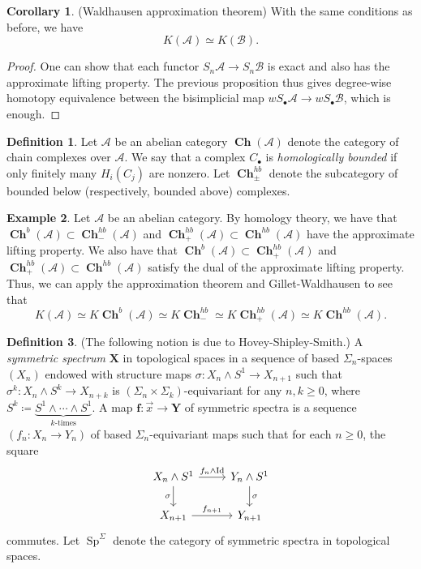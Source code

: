 \documentclass[10pt,letterpaper,cm]{nupset}
\theoremstyle{definition}
\newtheorem{definition}{Definition}
\newtheorem{exmp}[definition]{Example}
\theoremstyle{theorem}
\newtheorem{corollary}[theorem]{Corollary}
\theoremstyle{remark}
\newcommand{\X}{\mathbf X}
\newcommand{\1}{\mathbf{1}}
\renewcommand{\a}{\mathscr{A}}
\renewcommand{\b}{\mathscr{B}}
\newcommand{\x}{\vec x}
\newcommand{\0}{\vec 0}
\DeclareMathOperator{\id}{Id}
\DeclareMathOperator{\Sp}{Sp}
\DeclareMathOperator{\ch}{\mathbf{Ch}}
\begin{document}
\begin{corollary}{(Waldhausen approximation theorem)}
With the same conditions as before, we have $$K(\a) \simeq K(\b).$$
\end{corollary}
\begin{proof}
One can show that each functor $S_n \a \to S_n \b$ is exact and also has the approximate lifting property.  The previous proposition thus gives degree-wise homotopy equivalence between the bisimplicial map $wS_{\bullet}\a \to wS_{\bullet} \b$, which is enough. 
\end{proof}

\begin{definition}
Let $\a$ be an abelian category $\ch(\a)$ denote the category of chain complexes over $\a$. We say that a complex $C_{\bullet}$ is \textit{homologically bounded} if only finitely many $H_i(C_j)$ are nonzero. Let $\ch_{\pm}^{hb}$ denote the subcategory of bounded below (respectively, bounded above) complexes. 
\end{definition}

\begin{exmp}
Let $\a$ be an abelian category. By homology theory, we have that $\ch^b(\a) \subset \ch_{-}^{hb}(\a)$ and $\ch_+^{hb}(\a)\subset \ch^{hb}(\a)$ have the approximate lifting property. We also have that $\ch^b(\a) \subset \ch_+^{hb}(\a)$ and $\ch_+^{hb}(\a)\subset \ch^{hb}(\a)$ satisfy the dual of the approximate lifting property. Thus, we can apply the approximation theorem and Gillet-Waldhausen to see that $$  K(\a) \simeq K\ch^b(\a) \simeq  K\ch_{-}^{hb}\simeq K\ch_{+}^{hb}(\a) \simeq K \ch^{hb}(\a).$$
\end{exmp}

\begin{definition}
(The following notion is due to Hovey-Shipley-Smith.) A \textit{symmetric spectrum} $\X$ in topological spaces in a sequence of based $\Sigma_n$-spaces $(X_n)$ endowed with structure maps $\sigma : X_n \land S^1 \to X_{n+1}$ such that $\sigma^k : X_n \land S^k \to X_{n+k}$ is $(\Sigma_{n}\times \Sigma_{k})$-equivariant for any $n,k\geq 0$, where $S^k \coloneqq \underbrace{S^1 \land \cdots \land S^1}_{k\text{-times}}$. A map $\mathbf{f} : \x \to \mathbf{Y}$ of symmetric spectra is a sequence $(f_n : X_n \to Y_n)$ of based $\Sigma_n$-equivariant maps such that for each $n\geq 0$, the square
\[
\begin{tikzcd}
X_n \land S^1 \arrow[d, "\sigma"'] \arrow[r, "f_n \land \id"] & Y_n \land S^1 \arrow[d, "\sigma"] \\
X_{n+1} \arrow[r, "f_{n+1}"] & Y_{n+1}
\end{tikzcd}
\]
commutes. Let $\Sp^{\Sigma}$ denote the category of symmetric spectra in topological spaces.
\end{definition}
\end{document}
